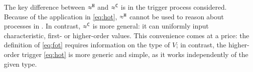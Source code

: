 \documentclass[runningheads]{llncs}
\begin{document}
{\begin{remark}
The key difference between $\approx^\mathtt{H}$ and $\approx^\mathtt{C}$ is in the trigger process considered. 
Because of the application in \eqref{eq:hot}, $\approx^\mathtt{H}$ 
cannot be used to reason about processes in \sessp. In contrast, $\approx^\mathtt{C}$ is more general:
it can uniformly input characteristic, first- or higher-order values.
This convenience comes at a price: the definition of \eqref{eq:fot} requires information on the 
type of $V$; in contrast, the higher-order trigger \eqref{eq:hot} is more generic and simple,
as it works independently of the given type.
%
%
%
%
\end{remark}

}
\end{document}
